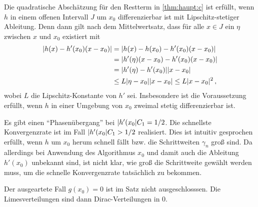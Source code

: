 \documentclass[ngerman,a4paper,11pt]{scrartcl}
\DeclarePairedDelimiter{\abs}{\lvert}{\rvert}		%
\begin{document}
\begin{rem}
  \begin{remlist}
  \item Die quadratische Abschätzung für den Restterm in \cref{thm:haupt:c} ist
    erfüllt, wenn $h$ in einem offenen Intervall $J$ um $x_0$ differenzierbar
    ist mit Lipschitz-stetiger Ableitung. Denn dann gilt nach dem
    Mittelwertsatz, dass für alle $x\in J$ ein $\eta$ zwischen $x$ und $x_0$
    existiert mit
    \begin{align*}
      \abs{h(x)-h'(x_0)(x-x_0)}&=\abs{h(x)-h(x_0)-h'(x_0)(x-x_0)} \\
                               &=\abs{h'(\eta)(x-x_0)-h'(x_0)(x-x_0)} \\
                               &=\abs{h'(\eta)-h'(x_0)}\abs{x-x_0} \\
                               &\leq L\abs{\eta-x_0}\abs{x-x_0}\leq L\abs{x-x_0}^2\,,
    \end{align*}
    wobei $L$ die Lipschitz-Konstante von $h'$ sei. Insbesondere ist die
    Voraussetzung erfüllt, wenn $h$ in einer Umgebung von $x_0$ zweimal stetig
    differenzierbar ist.
  \item Es gibt einen \enquote{Phasenübergang} bei $\abs{h'(x_0}C_1=1/2$. Die schnellste Konvergenzrate ist im Fall $\abs{h'(x_0}C_1>1/2$
  realisiert. Dies ist intuitiv gesprochen erfüllt, wenn $h$ um $x_0$ herum
  schnell fällt bzw. die Schrittweiten $\gamma_n$ groß sind. Da allerdings bei
  Anwendung des Algorithmus $x_0$ und damit auch die Ableitung $h'(x_0)$
  unbekannt sind, ist nicht klar, wie groß die Schrittweite gewählt werden muss,
  um die schnelle Konvergenzrate tatsächlich zu bekommen.
\item Der ausgeartete Fall $g(x_0)=0$ ist im Satz nicht ausgeschlosssen. Die
  Limesverteilungen sind dann Dirac-Verteilungen in 0.
  \end{remlist}
\end{rem}
\end{document}
